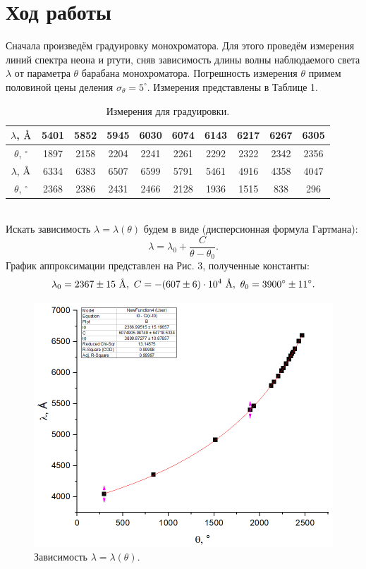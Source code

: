 \documentclass[a4paper,12pt]{article}
\newcommand{\angstrom}{\text{\normalfont\AA}}
\begin{document}
\section*{Ход работы}
Сначала произведём градуировку монохроматора. Для этого проведём измерения линий спектра неона и ртути, сняв зависимость длины волны наблюдаемого света $\lambda$ от параметра $\theta$ барабана монохроматора. Погрешность измерения $\theta$ примем половиной цены деления $\sigma_\theta = 5^\circ$. Измерения представлены в Таблице 1.
\begin{table}[h]
\begin{tabular}{|c|c|c|c|c|c|c|c|c|c|}
\hline
$\lambda$, $\angstrom$ & 5401 & 5852 & 5945 & 6030 & 6074 & 6143 & 6217 & 6267 & 6305 \\ \hline
$\theta$, $^\circ$  & 1897 & 2158 & 2204 & 2241 & 2261 & 2292 & 2322 & 2342 & 2356 \\ \hhline{|==========|}
$\lambda$, $\angstrom$ & 6334 & 6383 & 6507 & 6599 & 5791 & 5461 & 4916 & 4358 & 4047 \\ \hline
$\theta$, $^\circ$  & 2368 & 2386 & 2431 & 2466 & 2128 & 1936 & 1515 & 838  & 296  \\ \hline
\end{tabular}
\centering
\caption{Измерения для градуировки.}
\end{table}\\
Искать зависимость $\lambda = \lambda(\theta)$ будем в виде (дисперсионная формула Гартмана):
\[\lambda = \lambda_0 + \dfrac{C}{\theta - \theta_0}.\]
График аппроксимации представлен на Рис. 3, полученные константы:
\[\lambda_0 = 2367 \pm 15~\angstrom,~C = -(607 \pm 6) \cdot 10^4 ~\angstrom,~\theta_0 = 3900^\circ \pm 11^\circ.\]
\newpage
\begin{figure}
\includegraphics[scale=0.6]{3.png}
\centering
\caption{Зависимость $\lambda = \lambda(\theta)$.}
\end{figure}
\end{document}
